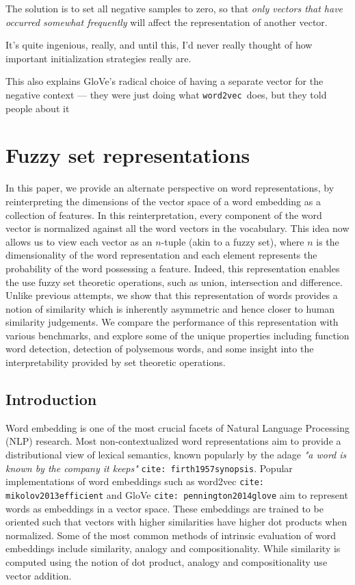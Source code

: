 \documentclass{book}
\newcommand{\wtov}{\texttt{word2vec }}
\newcommand{\citep}[1]{\texttt{cite: #1}}
\begin{document}
The solution is to set all negative samples to zero, so that 
\emph{only vectors that have occurred somewhat frequently} will affect the representation 
of another vector.

It's quite ingenious, really, and until this, I'd never really thought of
how important initialization strategies really are.


This also explains GloVe's radical choice of having a separate vector
for the negative context --- they were just doing what \wtov does, but
they told people about it 



\chapter{Fuzzy set representations}

In this paper, we provide an alternate perspective on word representations, by
reinterpreting the dimensions of the vector space of a word embedding as a
collection of features. In this reinterpretation, every component of the word
vector is normalized against all the word vectors in the vocabulary. This idea
now allows us to view each vector as an $n$-tuple (akin to a fuzzy set), where
$n$ is the dimensionality of the word representation and each element
represents the probability of the word possessing a feature. Indeed, this
representation enables the use fuzzy set theoretic operations, such as union,
intersection and difference. Unlike previous attempts, we show that this
representation of words provides a notion of similarity which is inherently
asymmetric and hence closer to human similarity judgements. We compare the
performance of this representation with various benchmarks, and explore some of
the unique properties including function word detection, detection of
polysemous words, and some insight into the interpretability provided by set
theoretic operations.

\section{Introduction} \label{sec: intro}

Word embedding is one of the most crucial facets of Natural Language Processing
(NLP) research. Most non-contextualized word representations aim to provide a
distributional view of lexical semantics, known popularly by the adage
\textit{"a word is known by the company it keeps"} \citep{firth1957synopsis}.
Popular implementations of word embeddings such as word2vec
\citep{mikolov2013efficient} and GloVe \citep{pennington2014glove} aim to
represent words as embeddings in a vector space. These embeddings are trained
to be oriented such that vectors with higher similarities have higher dot
products when normalized. Some of the most common methods of intrinsic
evaluation of word embeddings include similarity, analogy and compositionality.
While similarity is computed using the notion of dot product, analogy and
compositionality use vector addition.
\end{document}
